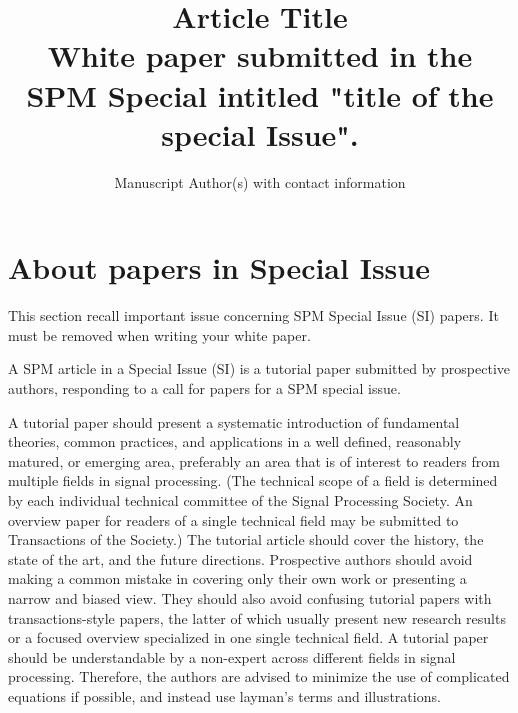 \documentclass[journal,onecolumn]{IEEEtran}
\begin{document}
\title{Article Title \\
{\large {White paper submitted  in the SPM Special intitled "title of the special Issue".}}}

\author{Manuscript Author(s) with contact information }



\maketitle
\section*{About papers in Special Issue}

{\color{blue} This section recall important issue concerning SPM Special Issue (SI) papers. It must be removed when writing your white paper.}

A SPM article in a Special Issue (SI) is a tutorial paper submitted by prospective authors, responding to a call for papers for a SPM special issue.

A tutorial paper should present a systematic introduction of fundamental theories, common practices, and applications in a well defined, reasonably matured, or emerging area, preferably an area that is of interest to readers from multiple fields in signal processing. (The technical scope of a field is determined by each individual technical committee of the Signal Processing Society. An overview paper for readers of a single technical field may be submitted to Transactions of the Society.)
The tutorial article should cover the history, the state of the art, and the future directions. Prospective authors should avoid making a common mistake in covering only their own work or presenting a narrow and biased view. They should also avoid confusing tutorial papers with transactions-style papers, the latter of which usually present new research results or a focused overview specialized in one single technical field. A tutorial paper should be understandable by a non-expert across different fields in signal processing. Therefore, the authors are advised to minimize the use of complicated equations if possible, and instead use layman's terms and illustrations.\\
\end{document}

